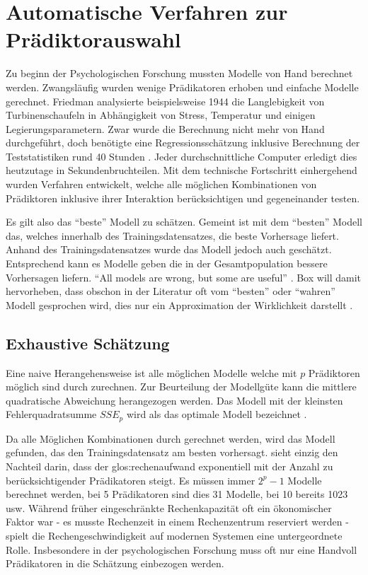 \section{Automatische Verfahren zur Prädiktorauswahl}
Zu beginn der Psychologischen Forschung mussten Modelle von Hand berechnet werden. Zwangsläufig wurden wenige Prädikatoren erhoben und einfache Modelle gerechnet. 
Friedman analysierte beispielsweise 1944 die Langlebigkeit von Turbinenschaufeln in Abhängigkeit von Stress, Temperatur und einigen Legierungsparametern. 
Zwar wurde die Berechnung nicht mehr von Hand durchgeführt, doch benötigte eine Regressionsschätzung inklusive Berechnung der Teststatistiken rund 40 Stunden \cite[p.2]{armstrong2011illusions}. Jeder durchschnittliche Computer erledigt dies heutzutage in Sekundenbruchteilen. 
Mit dem technische Fortschritt einhergehend wurden Verfahren entwickelt, welche alle möglichen Kombinationen von Prädiktoren inklusive ihrer Interaktion berücksichtigen und gegeneinander testen.

Es gilt also das ``beste'' Modell zu schätzen. 
Gemeint ist mit dem ``besten'' Modell das, welches innerhalb des Trainingsdatensatzes, die beste Vorhersage liefert. 
Anhand des Trainingsdatensatzes wurde das Modell jedoch auch geschätzt. Entsprechend kann es Modelle geben die in der Gesamtpopulation bessere Vorhersagen liefern. 
``All models are wrong, but some are useful'' \cite[p.202]{box1979robustness}.
Box will damit hervorheben, dass obschon in der Literatur oft vom ``besten'' oder ``wahren'' Modell gesprochen wird, dies nur ein Approximation der Wirklichkeit darstellt \cite[p.172]{weakliem2004introduction}.

\subsection{Exhaustive Schätzung} 
Eine naive Herangehensweise ist alle möglichen Modelle welche mit $p$ Prädiktoren möglich sind durch zurechnen. 
Zur Beurteilung der Modellgüte kann die mittlere quadratische Abweichung herangezogen werden.
Das Modell mit der kleinsten Fehlerquadratsumme $SSE_p$ wird als das  optimale Modell bezeichnet \cite[p. 6]{thompson1978selection}. 


Da alle Möglichen Kombinationen durch gerechnet werden, wird das  Modell gefunden, das den Trainingsdatensatz am besten vorhersagt.
 sieht einzig den Nachteil darin, dass der \Gls{glos:rechenaufwand} exponentiell mit der Anzahl zu berücksichtigender Prädikatoren steigt. 
Es müssen immer $2^p-1$ Modelle berechnet werden, bei 5 Prädikatoren sind dies 31 Modelle, bei 10 bereits 1023 usw.
Während früher eingeschränkte Rechenkapazität oft ein ökonomischer Faktor war - es musste Rechenzeit in einem Rechenzentrum reserviert werden - spielt die Rechengeschwindigkeit auf modernen Systemen eine untergeordnete Rolle. 
Insbesondere in der psychologischen Forschung muss oft nur eine Handvoll Prädikatoren in die Schätzung einbezogen werden.

